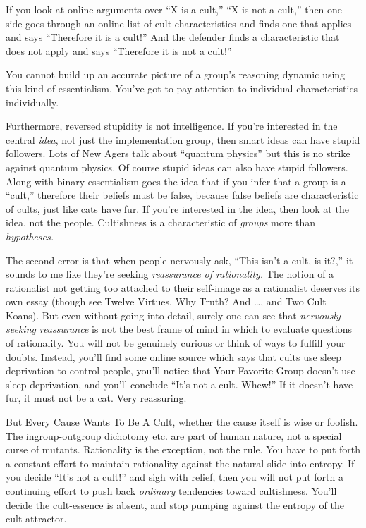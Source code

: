 {
 If you look at online arguments over ``X is a
cult,'' ``X is not a
cult,'' then one side goes through an online list of
cult characteristics and finds one that applies and says
``Therefore it is a cult!'' And the
defender finds a characteristic that does not apply and says
``Therefore it is not a cult!''}

{
 You cannot build up an accurate picture of a
group's reasoning dynamic using this kind of
essentialism. You've got to pay attention to individual
characteristics individually.}

{
 Furthermore, reversed stupidity is not intelligence. If
you're interested in the central \textit{idea}, not
just the implementation group, then smart ideas can have stupid
followers. Lots of New Agers talk about ``quantum
physics'' but this is no strike against quantum
physics. Of course stupid ideas can also have stupid followers. Along
with binary essentialism goes the idea that if you infer that a group
is a ``cult,'' therefore their
beliefs must be false, because false beliefs are characteristic of
cults, just like cats have fur. If you're interested in
the idea, then look at the idea, not the people. Cultishness is a
characteristic of \textit{groups} more than \textit{hypotheses.}}

{
 The second error is that when people nervously ask,
``This isn't a cult, is
it?,'' it sounds to me like they're
seeking \textit{reassurance of rationality.} The notion of a
rationalist not getting too attached to their self-image as a
rationalist deserves its own essay (though see Twelve Virtues, Why
Truth? And \ldots, and Two Cult Koans). But even without going into
detail, surely one can see that \textit{nervously seeking reassurance}
is not the best frame of mind in which to evaluate questions of
rationality. You will not be genuinely curious or think of ways to
fulfill your doubts. Instead, you'll find some online
source which says that cults use sleep deprivation to control people,
you'll notice that Your-Favorite-Group
doesn't use sleep deprivation, and
you'll conclude ``It's
not a cult. Whew!'' If it doesn't
have fur, it must not be a cat. Very reassuring.}

{
 But Every Cause Wants To Be A Cult, whether the cause itself is
wise or foolish. The ingroup-outgroup dichotomy etc. are part of human
nature, not a special curse of mutants. Rationality is the exception,
not the rule. You have to put forth a constant effort to maintain
rationality against the natural slide into entropy. If you decide
``It's not a cult!''
and sigh with relief, then you will not put forth a continuing effort
to push back \textit{ordinary} tendencies toward cultishness.
You'll decide the cult-essence is absent, and stop
pumping against the entropy of the cult-attractor.}

